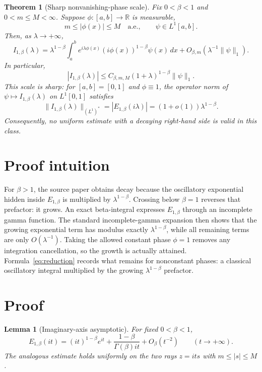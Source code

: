 \documentclass[11pt]{article}
\newtheorem{theorem}{Theorem}
\newtheorem{lemma}{Lemma}
\newcommand{\R}{\mathbb R}
\newcommand{\ML}[2]{E_{#1,#2}}
\begin{document}
\begin{theorem}[Sharp nonvanishing-phase scale]\label{thm:main}
Fix $0<\beta<1$ and $0<m\leq M<\infty$. Suppose
$\phi:[a,b]\to\R$ is measurable,
\[
 m\leq |\phi(x)|\leq M\quad\text{a.e.},
 \qquad \psi\in L^1[a,b].
\]
Then, as $\lambda\to+\infty$,
\begin{equation}\label{eq:reduction}
 I_{1,\beta}(\lambda)
 =\lambda^{1-\beta}\int_a^b
 e^{i\lambda\phi(x)}(i\phi(x))^{1-\beta}\psi(x)\,dx
 +O_{\beta,m}\!\left(\lambda^{-1}\|\psi\|_1\right).
\end{equation}
In particular,
\begin{equation}\label{eq:upper}
 |I_{1,\beta}(\lambda)|
 \leq C_{\beta,m,M}(1+\lambda)^{1-\beta}\|\psi\|_1.
\end{equation}
This scale is sharp: for $[a,b]=[0,1]$ and $\phi\equiv1$, the operator norm
of $\psi\mapsto I_{1,\beta}(\lambda)$ on $L^1[0,1]$ satisfies
\begin{equation}\label{eq:norm}
 \|I_{1,\beta}(\lambda)\|_{(L^1)^*}
 =|\ML{1}{\beta}(i\lambda)|
 =(1+o(1))\lambda^{1-\beta}.
\end{equation}
Consequently, no uniform estimate with a decaying right-hand side is valid
in this class.
\end{theorem}

\section{Proof intuition}

For $\beta>1$, the source paper obtains decay because the oscillatory
exponential hidden inside $\ML{1}{\beta}$ is multiplied by
$\lambda^{1-\beta}$. Crossing below $\beta=1$ reverses that prefactor: it
grows. An exact beta-integral expresses $\ML{1}{\beta}$ through an incomplete
gamma function. The standard incomplete-gamma expansion then shows that the
growing exponential term has modulus exactly $\lambda^{1-\beta}$, while all
remaining terms are only $O(\lambda^{-1})$. Taking the allowed constant phase
$\phi=1$ removes any integration cancellation, so the growth is actually
attained. Formula~\eqref{eq:reduction} records what remains for nonconstant
phases: a classical oscillatory integral multiplied by the growing
$\lambda^{1-\beta}$ prefactor.

\section{Proof}

\begin{lemma}[Imaginary-axis asymptotic]\label{lem:kernel}
For fixed $0<\beta<1$,
\begin{equation}\label{eq:kernel}
 \ML{1}{\beta}(it)
 =(it)^{1-\beta}e^{it}
 +\frac{1-\beta}{\Gamma(\beta)it}+O_\beta(t^{-2})
 \qquad(t\to+\infty).
\end{equation}
The analogous estimate holds uniformly on the two rays
$z=it s$ with $m\leq |s|\leq M$.
\end{lemma}
\end{document}
